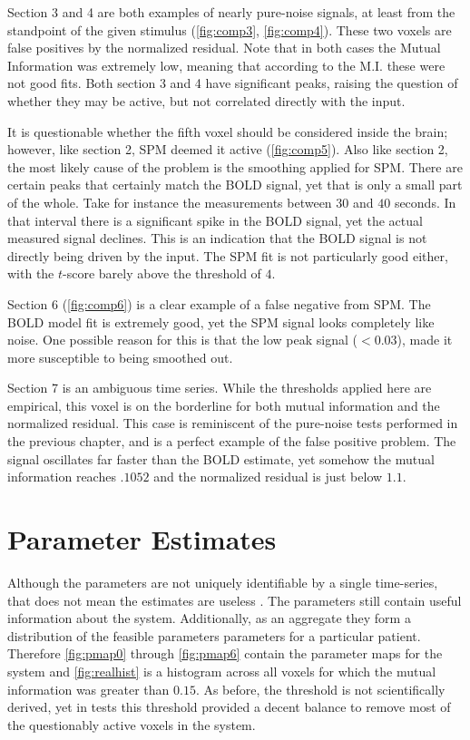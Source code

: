 Section 3 and 4 are both examples of nearly pure-noise signals, at least from the standpoint
of the given stimulus (\autoref{fig:comp3}, \autoref{fig:comp4}).
These two voxels are false positives by the normalized residual.
Note that in both cases the Mutual Information was extremely low, meaning that
according to the M.I. these were not good fits. Both section 3 and 4 have
significant peaks, raising the question of whether they may be active,
but not correlated directly with the input.

It is questionable whether the fifth voxel should be considered inside the
brain; however, like section 2, \ac{SPM} deemed it active (\autoref{fig:comp5}).
Also like section 2, the most likely cause of the problem is the smoothing
applied for \ac{SPM}. There are certain peaks that certainly match the
\ac{BOLD} signal, yet that is only a small part of the whole.
Take for instance the measurements between $30$ and $40$ seconds.
In that interval there is a significant spike in the \ac{BOLD} signal, yet the
actual measured signal declines. This is an indication that the \ac{BOLD} signal is not directly
being driven by the input. The \ac{SPM} fit is not particularly good either,
with the $t$-score barely above the threshold of $4$.

Section 6 (\autoref{fig:comp6}) is a clear example of a false negative
from \ac{SPM}. The \ac{BOLD} model fit is extremely good, yet the \ac{SPM} signal looks completely
like noise. One possible reason for this is that the low peak signal ($<0.03$),
made it more susceptible to being smoothed out.

Section 7 is an ambiguous time series. While the thresholds applied here
are empirical, this voxel is on the borderline for both mutual information
and the normalized residual.
This case is reminiscent of the pure-noise tests performed in the previous chapter,
and is a perfect example of the false positive problem.
The signal oscillates far faster than the \ac{BOLD} estimate, yet
somehow the mutual information reaches $.1052$ and the normalized residual is just below $1.1$.

\section{Parameter Estimates}
\label{sec:Real Data Parameter Estimates}
Although the parameters are not uniquely identifiable by a single time-series, that
does not mean the estimates are useless . The parameters still contain useful
information about the system. Additionally, as an aggregate they form a distribution of
the feasible parameters parameters for a particular patient. Therefore
\autoref{fig:pmap0} through \autoref{fig:pmap6}
contain the parameter maps for the system and \autoref{fig:realhist} is a histogram across all voxels
for which the mutual information was greater than $0.15$. As before, the threshold is not
scientifically derived, yet in tests this threshold provided a decent balance to remove most
of the questionably active voxels in the system.

